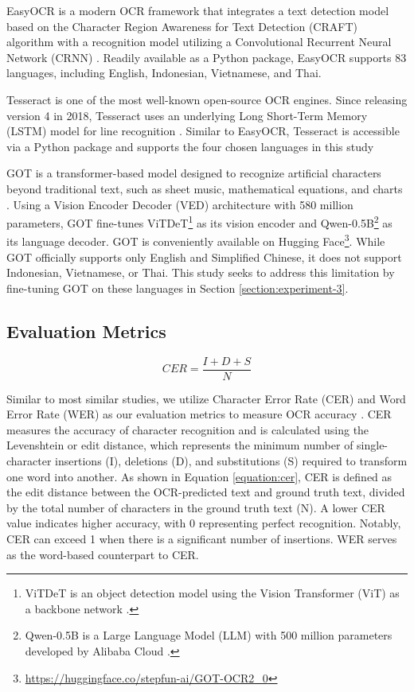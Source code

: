 \documentclass[12pt,oneside]{memoir}
\begin{document}
EasyOCR is a modern OCR framework that integrates a text detection model based on the Character Region Awareness for Text Detection (CRAFT) algorithm with a recognition model utilizing a Convolutional Recurrent Neural Network (CRNN) \parencite{easy-ocr-2025}.
Readily available as a Python package, EasyOCR supports 83 languages, including English, Indonesian, Vietnamese, and Thai.

Tesseract is one of the most well-known open-source OCR engines. Since releasing version 4 in 2018, Tesseract uses an underlying Long Short-Term Memory (LSTM) model for line recognition \parencite{tesseract-2025}.
Similar to EasyOCR, Tesseract is accessible via a Python package and supports the four chosen languages in this study 

GOT is a transformer-based model designed to recognize artificial characters beyond traditional text, such as sheet music, mathematical equations, and charts \parencite{wei-etal-2024}. 
Using a Vision Encoder Decoder (VED) architecture with 580 million parameters, GOT fine-tunes ViTDeT\footnote{ViTDeT is an object detection model using the Vision Transformer (ViT) as a backbone network \parencite{li-etal-2022}.} as its vision encoder and Qwen-0.5B\footnote{Qwen-0.5B is a Large Language Model (LLM) with 500 million parameters developed by Alibaba Cloud \parencite{qwen-2025}.} as its language decoder. 
GOT is conveniently available on Hugging Face\footnote{\url{https://huggingface.co/stepfun-ai/GOT-OCR2_0}}.
While GOT officially supports only English and Simplified Chinese, it does not support Indonesian, Vietnamese, or Thai. 
This study seeks to address this limitation by fine-tuning GOT on these languages in Section \ref{section:experiment-3}.

\subsection{Evaluation Metrics}

\begin{equation}
    CER = \frac{I + D + S}{N}
    \label{equation:cer}
\end{equation}

Similar to most similar studies, we utilize Character Error Rate (CER) and Word Error Rate (WER) as our evaluation metrics to measure OCR accuracy \parencite{hegghammer-2022, ignat-etal-2022}. 
CER measures the accuracy of character recognition and is calculated using the Levenshtein or edit distance, which represents the minimum number of single-character insertions (I), deletions (D), and substitutions (S) required to transform one word into another. 
As shown in Equation \ref{equation:cer}, CER is defined as the edit distance between the OCR-predicted text and ground truth text, divided by the total number of characters in the ground truth text (N). 
A lower CER value indicates higher accuracy, with 0 representing perfect recognition. 
Notably, CER can exceed 1 when there is a significant number of insertions. 
WER serves as the word-based counterpart to CER.
\end{document}

